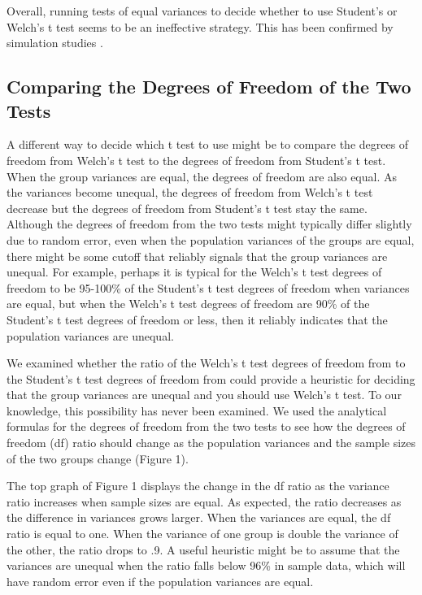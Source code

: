 \documentclass[man,a4paper,noextraspace,apacite]{apa6}
\begin{document}
Overall, running tests of equal variances to decide whether to use Student's or Welch's
t test seems to be an ineffective strategy. This has been confirmed by simulation 
studies \cite{Zimmerman1996,Zimmerman2004}. 

\subsection{Comparing the Degrees of Freedom of the Two Tests}

    A different way to decide which t test to use might be to compare the
degrees of freedom from Welch's t test to the degrees of freedom from
Student's t test. When the group variances are equal, the degrees of freedom
are also equal. As the variances become unequal, the degrees of freedom
from Welch's t test decrease but the degrees of freedom from Student's t test
stay the same. Although the degrees of freedom from the two tests might typically 
differ slightly due to random error, even when the population variances of the groups
are equal, there might be some cutoff that reliably signals that the group variances
are unequal. For example, perhaps it is typical for the Welch's t test degrees of freedom 
to be 95-100\% of the Student's t test degrees of freedom when variances are equal, but 
when the Welch's t test degrees of freedom are 90\% of the Student's t test degrees of freedom 
or less, then it reliably indicates that the population variances are unequal. 

    We examined whether the ratio of the Welch's t 
test degrees of freedom from to the Student's t test degrees of freedom from 
could provide a heuristic for deciding that 
the group variances are unequal and you should use Welch's t test. 
To our knowledge, this possibility has never
been examined. We used the analytical formulas for the  
degrees of freedom from the two tests to see how the degrees of freedom (df) ratio should change as 
the population variances and the sample sizes of the two groups change (Figure 1).

    The top graph of Figure 1 displays the change in the df ratio as the 
variance ratio increases when sample sizes are equal. As expected, the ratio 
decreases as the difference in variances grows larger. When the variances are 
equal, the df ratio is equal to one. When 
the variance of one group is double the variance of the other, the ratio drops 
to .9. A useful heuristic might be to assume that the variances are unequal 
when the ratio falls below 96\% in sample data, which will have random error 
even if the population variances are equal.
  
\end{document}
